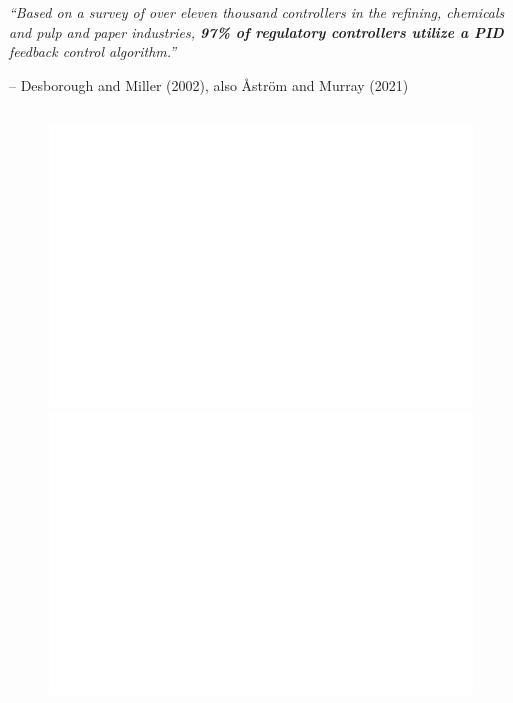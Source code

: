 \documentclass[
  letterpaper,
  DIV=11,
  numbers=noendperiod,
  oneside]{scrartcl}
\begin{document}
\emph{``Based on a survey of over eleven thousand controllers in the
refining, chemicals and pulp and paper industries, \textbf{97\% of
regulatory controllers utilize a PID} feedback control algorithm.''}

-- Desborough and Miller (2002), also Åström and Murray (2021)

\subsection{}\label{section-23}

\begin{figure}

\begin{minipage}{0.50\linewidth}
\includegraphics{figs/anim_impulse_u.gif}\end{minipage}%
%
\begin{minipage}{0.50\linewidth}
\includegraphics{figs/anim_impulse_y.gif}\end{minipage}%

\end{figure}%
\end{document}
